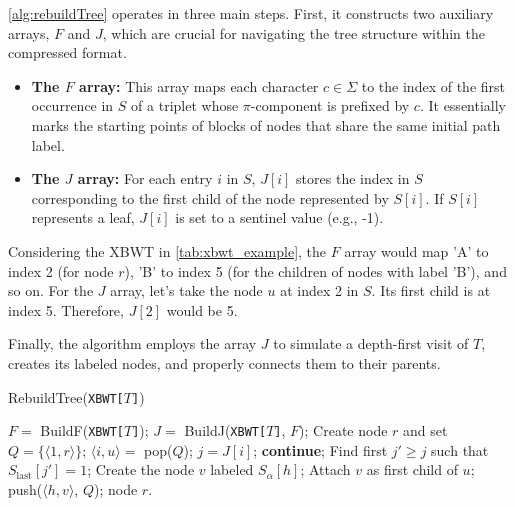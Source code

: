 \cref{alg:rebuildTree} operates in three main steps. First, it constructs two auxiliary arrays, $F$ and $J$, which are crucial for navigating the tree structure within the compressed format.

\begin{itemize}
    \item \textbf{The $F$ array:} This array maps each character $c \in \Sigma$ to the index of the first occurrence in $S$ of a triplet whose $\pi$-component is prefixed by $c$. It essentially marks the starting points of blocks of nodes that share the same initial path label.
    \item \textbf{The $J$ array:} For each entry $i$ in $S$, $J[i]$ stores the index in $S$ corresponding to the first child of the node represented by $S[i]$. If $S[i]$ represents a leaf, $J[i]$ is set to a sentinel value (e.g., -1).
\end{itemize}

\begin{example}
    Considering the XBWT in \cref{tab:xbwt_example}, the $F$ array would map 'A' to index 2 (for node $r$), 'B' to index 5 (for the children of nodes with label 'B'), and so on. For the $J$ array, let's take the node $u$ at index 2 in $S$. Its first child is at index 5. Therefore, $J[2]$ would be 5.
\end{example}

Finally, the algorithm employs the array $J$ to
simulate a depth-first visit of $T$, creates its labeled nodes, and properly connects them to their parents. 

\begin{algorithm}[H]
    \caption{RebuildTree(\texttt{XBWT[$T$]})}
    \label{alg:rebuildTree}
    \begin{algorithmic}[1]
    \State $F = $ BuildF(\texttt{XBWT[$T$]});
    \State $J = $ BuildJ(\texttt{XBWT[$T$]}, $F$); 
    \State Create node $r$ and set $Q = \{\langle1, r\rangle\}$; 
     
        \State $\langle i, u \rangle = $ pop($Q$);
        \State $j = J[i]$; 
         
            \State \textbf{continue};
        \EndIf
        \State Find first $j' \geq j$ such that $S_{\text{last}}[j'] = 1$; 
         
            \State Create the node $v$ labeled $S_\alpha[h]$;
            \State Attach $v$ as first child of $u$;
            \State push($\langle h, v \rangle$, $Q$);
        \EndFor
    \EndWhile
    \State \Return node $r$.
    \end{algorithmic}
\end{algorithm}

